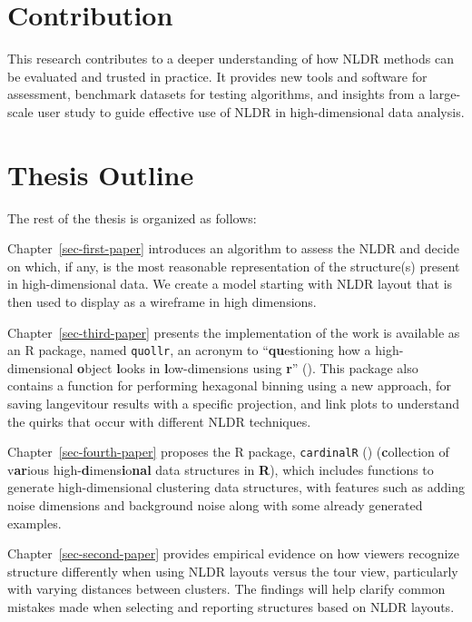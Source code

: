 \documentclass[
  11pt,
  a4paper,
]{report}
\begin{document}
\section{Contribution}\label{contribution}

This research contributes to a deeper understanding of how NLDR methods
can be evaluated and trusted in practice. It provides new tools and
software for assessment, benchmark datasets for testing algorithms, and
insights from a large-scale user study to guide effective use of NLDR in
high-dimensional data analysis.

\section{Thesis Outline}\label{thesis-outline}

The rest of the thesis is organized as follows:

Chapter~\ref{sec-first-paper} introduces an algorithm to assess the NLDR
and decide on which, if any, is the most reasonable representation of
the structure(s) present in high-dimensional data. We create a model
starting with NLDR layout that is then used to display as a wireframe in
high dimensions.

Chapter~\ref{sec-third-paper} presents the implementation of the work is
available as an R package, named \texttt{quollr}, an acronym to
``\textbf{qu}estioning how a high-dimensional \textbf{o}bject
\textbf{l}ooks in \textbf{l}ow-dimensions using \textbf{r}''
(). This package also
contains a function for performing hexagonal binning using a new
approach, for saving langevitour results with a specific projection, and
link plots to understand the quirks that occur with different NLDR
techniques.

Chapter~\ref{sec-fourth-paper} proposes the R package,
\texttt{cardinalR} ()
(\textbf{c}ollection of v\textbf{ar}ious
high-\textbf{d}imens\textbf{i}o\textbf{nal} data structures in
\textbf{R}), which includes functions to generate high-dimensional
clustering data structures, with features such as adding noise
dimensions and background noise along with some already generated
examples.

Chapter~\ref{sec-second-paper} provides empirical evidence on how
viewers recognize structure differently when using NLDR layouts versus
the tour view, particularly with varying distances between clusters. The
findings will help clarify common mistakes made when selecting and
reporting structures based on NLDR layouts.
\end{document}
